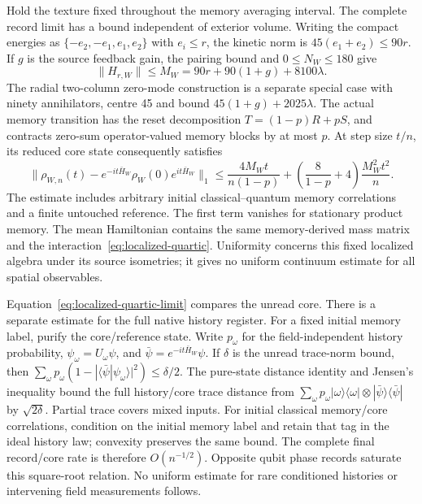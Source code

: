 Hold the texture fixed throughout the memory averaging interval. The
complete record limit has a bound independent of exterior volume.
Writing the compact energies as $\{-e_2,-e_1,e_1,e_2\}$ with
$e_i\leq r$, the kinetic norm is $45(e_1+e_2)\leq90r$.
If $g$ is the source feedback gain, the pairing bound and
$0\leq N_W\leq180$ give
\[
 \|H_{r,W}\|\leq M_W=90r+90(1+g)+8100\lambda.
\]
The radial two-column zero-mode construction is a separate special case
with ninety annihilators, centre 45 and bound $45(1+g)+2025\lambda$.
The actual memory transition has the reset decomposition
$T=(1-p)R+pS$, and contracts zero-sum operator-valued memory blocks by
at most $p$.  At step size $t/n$, its reduced core state consequently
satisfies
\begin{equation}
 \|\rho_{W,n}(t)-e^{-it\bar H_W}\rho_W(0)e^{it\bar H_W}\|_1
 \leq\frac{4M_Wt}{n(1-p)}
 +\left(\frac8{1-p}+4\right)\frac{M_W^2t^2}{n}.
 \label{eq:localized-quartic-limit}
\end{equation}
The estimate includes arbitrary initial classical--quantum memory
correlations and a finite untouched reference.  The first term vanishes
for stationary product memory.  The mean Hamiltonian contains the same
memory-derived mass matrix and the interaction~\eqref{eq:localized-quartic}.
Uniformity concerns this fixed localized algebra under its source
isometries; it gives no uniform continuum estimate for all spatial
observables.

Equation~\eqref{eq:localized-quartic-limit} compares the unread core.
There is a separate estimate for the full native history register.
For a fixed initial memory label, purify the core/reference state.
Write $p_\omega$ for the field-independent history probability,
$\psi_\omega=U_\omega\psi$, and
$\bar\psi=e^{-it\bar H_W}\psi$.  If $\delta$ is the unread trace-norm
bound, then
$\sum_\omega p_\omega(1-|\langle\bar\psi|\psi_\omega\rangle|^2)
\leq\delta/2$.
The pure-state distance identity and Jensen's inequality bound the
full history/core trace distance from
$\sum_\omega p_\omega|\omega\rangle\langle\omega|
\otimes|\bar\psi\rangle\langle\bar\psi|$
by $\sqrt{2\delta}$.  Partial trace covers mixed inputs.  For initial
classical memory/core correlations, condition on the initial memory
label and retain that tag in the ideal history law; convexity preserves
the same bound.  The complete final record/core rate is therefore
$O(n^{-1/2})$.  Opposite qubit phase records saturate this square-root
relation.  No uniform estimate for rare conditioned histories or
intervening field measurements follows.

